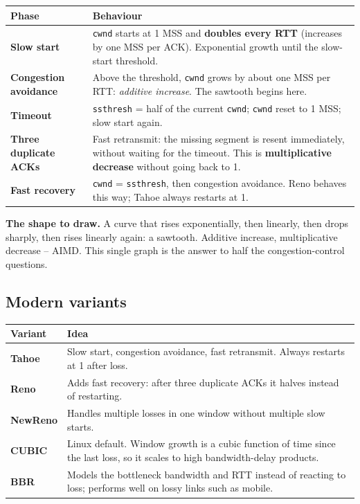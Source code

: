 \documentclass[11pt,a4paper]{article}
\begin{document}
\begin{center}\small
\begin{tabularx}{\textwidth}{>{\bfseries}p{} X}
\toprule Phase & Behaviour\\
\midrule
Slow start & \texttt{cwnd} starts at 1 MSS and \textbf{doubles every RTT} (increases by one MSS per ACK). Exponential growth until the slow-start threshold.\\
Congestion avoidance & Above the threshold, \texttt{cwnd} grows by about one MSS per RTT: \emph{additive increase}. The sawtooth begins here.\\
Timeout & \texttt{ssthresh} = half of the current \texttt{cwnd}; \texttt{cwnd} reset to 1 MSS; slow start again.\\
Three duplicate ACKs & Fast retransmit: the missing segment is resent immediately, without waiting for the timeout. This is \textbf{multiplicative decrease} without going back to 1.\\
Fast recovery & \texttt{cwnd} = \texttt{ssthresh}, then congestion avoidance. Reno behaves this way; Tahoe always restarts at 1.\\
\bottomrule
\end{tabularx}
\end{center}

\begin{rememberbox}
\textbf{The shape to draw.} A curve that rises exponentially, then linearly, then drops sharply, then rises linearly again: a sawtooth. Additive increase, multiplicative decrease -- AIMD. This single graph is the answer to half the congestion-control questions.
\end{rememberbox}

\subsection{Modern variants}

\begin{center}\small
\begin{tabularx}{\textwidth}{>{\bfseries}p{} X}
\toprule Variant & Idea\\
\midrule
Tahoe & Slow start, congestion avoidance, fast retransmit. Always restarts at 1 after loss.\\
Reno & Adds fast recovery: after three duplicate ACKs it halves instead of restarting.\\
NewReno & Handles multiple losses in one window without multiple slow starts.\\
CUBIC & Linux default. Window growth is a cubic function of time since the last loss, so it scales to high bandwidth-delay products.\\
BBR & Models the bottleneck bandwidth and RTT instead of reacting to loss; performs well on lossy links such as mobile.\\
\bottomrule
\end{tabularx}
\end{center}
\end{document}
